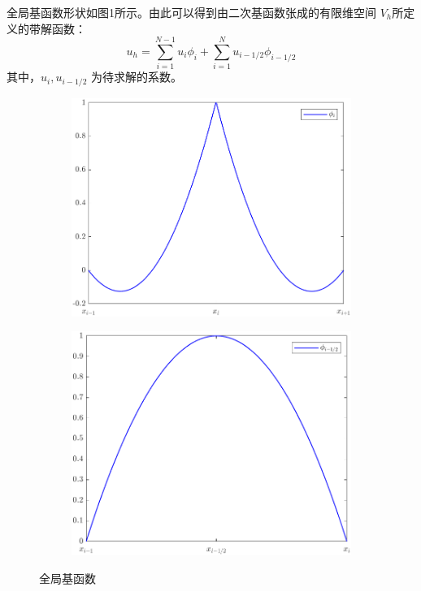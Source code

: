 \documentclass[11pt]{ctexart}
\begin{document}
全局基函数形状如图1所示。由此可以得到由二次基函数张成的有限维空间 $ V_h $所定义的带解函数：
\begin{equation}
     u_h = \sum_{i=1}^{N-1} u_i \phi_i + \sum_{i=1}^{N} u_{i-1/2} \phi_{i-1/2}
\end{equation}
其中，$ u_i, u_{i-1/2} $ 为待求解的系数。

\begin{figure}[htbp]
     \centering
     \begin{subfigure}{0.4\textwidth}
          \centering
          \includegraphics[width=0.9\linewidth]{phi_i.png}
     \end{subfigure}
     \begin{subfigure}{0.4\textwidth}
          \centering
          \includegraphics[width=0.9\linewidth]{phi_12.png}
     \end{subfigure}
     \caption{全局基函数}
\end{figure}
\end{document}
